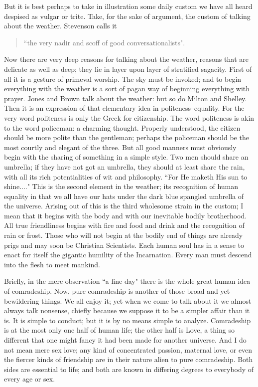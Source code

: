 \documentclass[final,10pt,letterpaper,twocolumn,openany]{book}
\begin{document}
But it is best perhaps to take in illustration some daily custom we have
all heard despised as vulgar or trite. Take, for the sake of argument, the
custom of talking about the weather. Stevenson calls it 

\begin{quotation}\noindent
	``the very nadir and
	scoff of good conversationalists".
\end{quotation}

 Now there are very deep reasons for
talking about the weather, reasons that are delicate as well as deep; they lie
in layer upon layer of stratified sagacity. First of all it is a gesture of
primeval worship. The sky must be invoked; and to begin everything with
the weather is a sort of pagan way of beginning everything with prayer.
Jones and Brown talk about the weather: but so do Milton and Shelley.
Then it is an expression of that elementary idea in politeness--equality. For
the very word politeness is only the Greek for citizenship. The word
politeness is akin to the word policeman: a charming thought. Properly
understood, the citizen should be more polite than the gentleman; perhaps
the policeman should be the most courtly and elegant of the three. But all
good manners must obviously begin with the sharing of something in a
simple style. Two men should share an umbrella; if they have not got an
umbrella, they should at least share the rain, with all its rich potentialities
of wit and philosophy. ``For He maketh His sun to shine...." This is the
second element in the weather; its recognition of human equality in that
we all have our hats under the dark blue spangled umbrella of the universe.
Arising out of this is the third wholesome strain in the custom; I mean that
it begins with the body and with our inevitable bodily brotherhood. All
true friendliness begins with fire and food and drink and the recognition of
rain or frost. Those who will not begin at the bodily end of things are
already prigs and may soon be Christian Scientists. Each human soul has
in a sense to enact for itself the gigantic humility of the Incarnation. Every
man must descend into the flesh to meet mankind.

Briefly, in the mere observation ``a fine day" there is the whole great
human idea of comradeship. Now, pure comradeship is another of those
broad and yet bewildering things. We all enjoy it; yet when we come to
talk about it we almost always talk nonsense, chiefly because we suppose
it to be a simpler affair than it is. It is simple to conduct; but it is by no
means simple to analyze. Comradeship is at the most only one half of
human life; the other half is Love, a thing so different that one might fancy
it had been made for another universe. And I do not mean mere sex love;
any kind of concentrated passion, maternal love, or even the fiercer kinds
of friendship are in their nature alien to pure comradeship. Both sides are
essential to life; and both are known in differing degrees to everybody of
every age or sex. 
\end{document}
